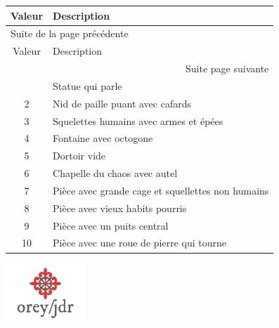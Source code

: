 \documentclass[a4paper, 11pt, twoside]{article}
\begin{document}
\begin{longtable}{c|l}
Valeur & Description\\
\hline
\endfirsthead
\multicolumn{2}{l}{Suite de la page précédente} \\
\hline

Valeur & Description \\

\hline
\endhead
\hline\multicolumn{2}{r}{Suite page suivante} \\
\endfoot
\endlastfoot
\hline
1 & Statue qui parle\\
2 & Nid de paille puant avec cafards\\
3 & Squelettes humains avec armes et épées\\
4 & Fontaine avec octogone\\
5 & Dortoir vide\\
6 & Chapelle du chaos avec autel\\
7 & Pièce avec grande cage et squellettes non humains\\
8 & Pièce avec vieux habits pourris\\
9 & Pièce avec un puits central\\
10 & Pièce avec une roue de pierre qui tourne\\
\end{longtable}

\vfill

\begin{center}
\includegraphics[width=3cm]{logo-orey-big.png}
\end{center}
\end{document}
